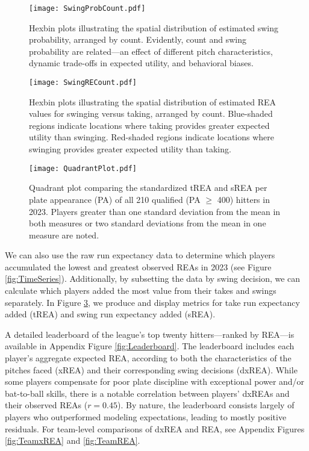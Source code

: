 \documentclass[12pt]{article}
\numberwithin{equation}{section}
\begin{document}
\begin{figure}[H]
    \centering
    \texttt{[image: SwingProbCount.pdf]}
    \captionsetup{font=small, width=0.9\linewidth}
    \caption{Hexbin plots illustrating the spatial distribution of estimated swing probability, arranged by count. Evidently, count and swing probability are related---an effect of different pitch characteristics, dynamic trade-offs in expected utility, and behavioral biases.}
    \label{fig:SwingProbCount}
\end{figure}

\begin{figure}[H]
    \centering
    \texttt{[image: SwingRECount.pdf]}
    \captionsetup{font=small, width=0.9\linewidth}
    \caption{Hexbin plots illustrating the spatial distribution of estimated REA values for swinging versus taking, arranged by count. Blue-shaded regions indicate locations where taking provides greater expected utility than swinging. Red-shaded regions indicate locations where swinging provides greater expected utility than taking.}
    \label{fig:SwingREACount}
\end{figure}

\begin{figure}[H]
    \centering
    \texttt{[image: QuadrantPlot.pdf]}
    \caption{Quadrant plot comparing the standardized tREA and sREA per plate appearance (PA) of all 210 qualified (PA $\ge$ 400) hitters in 2023. Players greater than one standard deviation from the mean in both measures or two standard deviations from the mean in one measure are noted.}
    \label{fig:QuadrantPlot}
\end{figure}

We can also use the raw run expectancy data to determine which players accumulated the lowest and greatest observed REAs in 2023 (see Figure \ref{fig:TimeSeries}). Additionally, by subsetting the data by swing decision, we can calculate which players added the most value from their takes and swings separately. In Figure \ref{fig:QuadrantPlot}, we produce and display metrics for take run expectancy added (tREA) and swing run expectancy added (sREA).

A detailed leaderboard of the league’s top twenty hitters---ranked by REA---is available in Appendix Figure \ref{fig:Leaderboard}. The leaderboard includes each player’s aggregate expected REA, according to both the characteristics of the pitches faced (xREA) and their corresponding swing decisions (dxREA). While some players compensate for poor plate discipline with exceptional power and/or bat-to-ball skills, there is a notable correlation between players' dxREAs and their observed REAs ($r = 0.45$). By nature, the leaderboard consists largely of players who outperformed modeling expectations, leading to mostly positive residuals. For team-level comparisons of dxREA and REA, see Appendix Figures \ref{fig:TeamxREA} and \ref{fig:TeamREA}.
\end{document}
